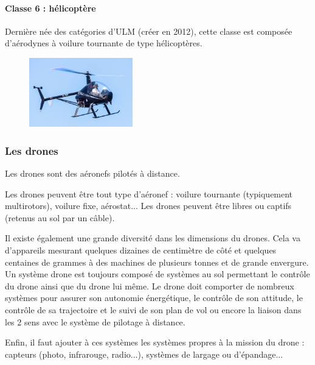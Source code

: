 	\paragraph{Classe 6 : hélicoptère}	
	Dernière née des catégories d'ULM (créer en 2012), cette classe est composée d'aérodynes à voilure tournante de type hélicoptères.
	
	\begin{figure}[H]
  	\centering
    \includegraphics[width=0.4\textwidth]{01-EtudeAeronefs/img/ULM_Classe_6.jpg}
	\end{figure}


\subsubsection{Les drones}
Les drones sont des aéronefs pilotés à distance. 

Les drones peuvent être tout type d'aéronef : voilure tournante (typiquement multirotors), voilure fixe, aérostat... Les drones peuvent être libres ou captifs (retenus au sol par un câble).

Il existe également une grande diversité dans les dimensions du drones. Cela va d'appareils mesurant quelques dizaines de centimètre de côté et quelques centaines de grammes à des machines de plusieurs tonnes et de grande envergure. \\

Un système drone est toujours composé de systèmes au sol permettant le contrôle du drone ainsi que du drone lui même. Le drone doit comporter de nombreux systèmes pour assurer son autonomie énergétique, le contrôle de son attitude, le contrôle de sa trajectoire et le suivi de son plan de vol ou encore la liaison dans les 2 sens avec le système de pilotage à distance. 

Enfin, il faut ajouter à ces systèmes les systèmes propres à la mission du drone : capteurs (photo, infrarouge, radio...), systèmes de largage ou d'épandage...
